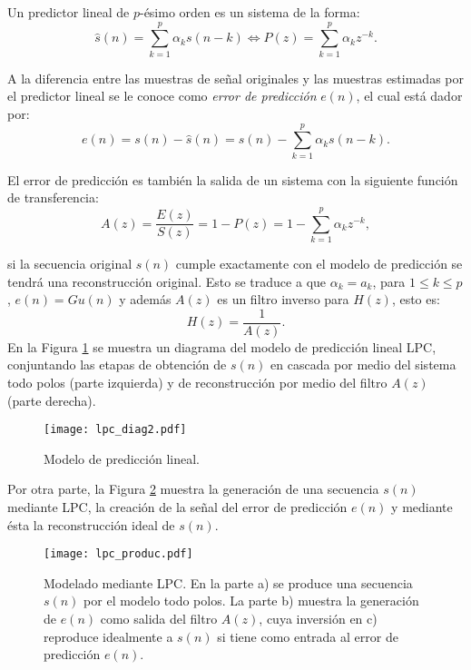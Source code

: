 Un predictor lineal de $p$-ésimo orden es un sistema de la forma:
\begin{equation}\label{predic_lineal}
\hat{s}(n) = \sum_{k=1}^p\alpha_{k}s(n-k) \Leftrightarrow P(z) = \sum_{k=1}^{p} \alpha_{k}z^{-k}.
\end{equation}

A la diferencia entre las muestras de señal originales y las muestras estimadas por el predictor lineal se le conoce como \emph{error de predicción} $e(n)$, el cual está dador por:
\begin{equation} \label{error}
e(n)= s(n)-\hat{s}(n) = s(n)-\sum_{k=1}^{p} \alpha_{k}s(n-k). 
\end{equation}

El error de predicción es también la salida de un sistema con la siguiente función de transferencia:
\begin{equation}\label{trans_az}
A(z) = \frac{E(z)}{S(z)} = 1-P(z) = 1-\sum_{k=1}^p \alpha_{k}z^{-k},
\end{equation}

si la secuencia original $s(n)$ cumple exactamente con el modelo de predicción se tendrá una reconstrucción original. Esto se traduce a que $\alpha_{k} = a_{k}$, para $1\leq k \leq p $, $e(n)=Gu(n)$ y además $A(z)$ es un filtro inverso para $H(z)$, esto es:
\begin{equation}\label{trans_hz}
H(z) = \frac{1}{A(z)}.
\end{equation}
En la Figura \ref{lpc_diag2} se muestra un diagrama del modelo de predicción lineal LPC, conjuntando las etapas de obtención de $s(n)$ en cascada por medio del sistema todo polos (parte izquierda) y de reconstrucción por medio del filtro $A(z)$ (parte derecha).

\begin{figure} [ht]
  \centering
  \texttt{[image: lpc\_diag2.pdf]}
  \caption{Modelo de predicción lineal.}
  \label{lpc_diag2}
\end{figure}

Por otra parte, la Figura \ref{lpc_diag1} muestra la generación de una secuencia $s(n)$ mediante LPC, la creación de la señal del error de predicción $e(n)$ y mediante ésta la reconstrucción ideal de $s(n)$.

\begin{figure} [h!]
  \centering
  \texttt{[image: lpc\_produc.pdf]}
  \caption{Modelado mediante LPC. En la parte a) se produce una secuencia $s(n)$ por el modelo todo polos. La parte b) muestra la generación de $e(n)$ como salida del filtro $A(z)$, cuya inversión en c) reproduce idealmente a $s(n)$ si tiene como entrada al error de predicción $e(n)$.}
  \label{lpc_diag1}
\end{figure}

